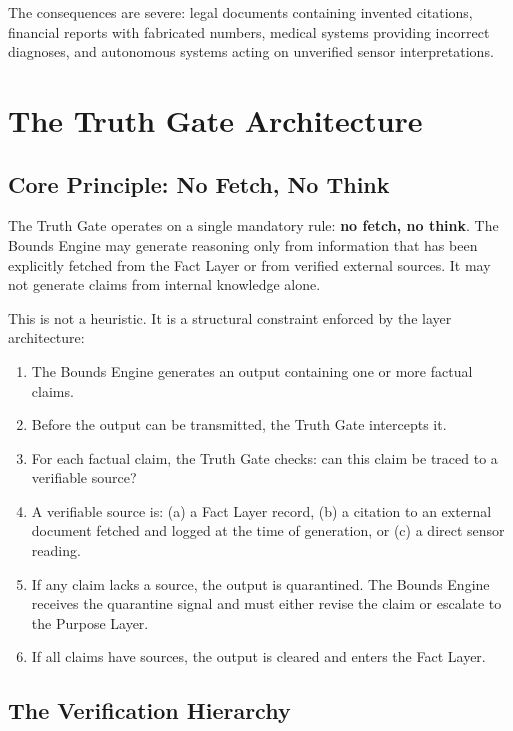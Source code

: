 \documentclass[12pt]{article}
\begin{document}
The consequences are severe: legal documents containing invented citations, financial reports with fabricated numbers, medical systems providing incorrect diagnoses, and autonomous systems acting on unverified sensor interpretations.

\section{The Truth Gate Architecture}
\label{sec:architecture}

\subsection{Core Principle: No Fetch, No Think}

The Truth Gate operates on a single mandatory rule: \textbf{no fetch, no think}. The Bounds Engine may generate reasoning only from information that has been explicitly fetched from the Fact Layer or from verified external sources. It may not generate claims from internal knowledge alone.

This is not a heuristic. It is a structural constraint enforced by the layer architecture:

\begin{enumerate}
    \item The Bounds Engine generates an output containing one or more factual claims.
    \item Before the output can be transmitted, the Truth Gate intercepts it.
    \item For each factual claim, the Truth Gate checks: can this claim be traced to a verifiable source?
    \item A verifiable source is: (a) a Fact Layer record, (b) a citation to an external document fetched and logged at the time of generation, or (c) a direct sensor reading.
    \item If any claim lacks a source, the output is quarantined. The Bounds Engine receives the quarantine signal and must either revise the claim or escalate to the Purpose Layer.
    \item If all claims have sources, the output is cleared and enters the Fact Layer.
\end{enumerate}

\subsection{The Verification Hierarchy}
\end{document}

